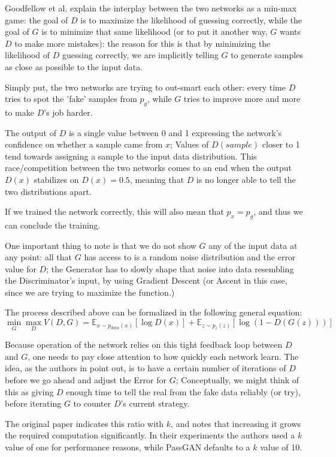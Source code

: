 Goodfellow et al.\cite{Goodfellow2014} explain the interplay between the two networks as a min-max game: the goal of $D$ is to maximize the likelihood of guessing correctly, while the goal of $G$ is to minimize that same likelihood (or to put it another way, $G$ wants $D$ to make more mistakes): the reason for this is that by minimizing the likelihood of $D$ guessing correctly, we are implicitly telling $G$ to generate samples as close as possible to the input data.

Simply put, the two networks are trying to out-smart each other: every time $D$ tries to spot the 'fake' samples from $p_g$, while $G$ tries to improve more and more to make $D$'s job harder.

The output of $D$ is a single value between 0 and 1 expressing the network's confidence on whether a sample came from $x$; Values of $D(sample)$ closer to 1 tend towards assigning a sample to the input data distribution.
This race/competition between the two networks comes to an end when the output $D(x)$ stabilizes on $D(x)=0.5$, meaning that $D$ is no longer able to tell the two distributions apart.

If we trained the network correctly, this will also mean that $p_x=p_g$, and thus we can conclude the training.

One important thing to note is that we do not show $G$ any of the input data at any point: all that $G$ has access to is a random noise distribution and the error value for $D$; the Generator has to slowly shape that noise into data resembling the Discriminator's input, by using Gradient Descent (or Ascent in this case, since we are trying to maximize the function.)

The process described above can be formalized in the following general equation:
\begin{equation}
 \min\limits_{G} \max\limits_{D} V(D,G)=\mathbb{E}_{x\sim p_{data}(x)}[\log{D(x)}]+\mathbb{E}_{z\sim p_z(z)}[\log{(1-D(G(z)))}] 
\end{equation} 

Because operation of the network relies on this tight feedback loop between $D$ and $G$, one needs to pay close attention to how quickly each network learn.
The idea, as the authors in \cite{Goodfellow2014} point out, is to have a certain number of iterations of $D$ before we go ahead and adjust the Error for $G$; Conceptually, we might think of this as giving $D$ enough time to tell the real from the fake data reliably (or try), before iterating $G$ to counter $D$'s current strategy.

The original paper indicates this ratio with $k$, and notes that increasing it grows the required computation significantly. In their experiments the authors used a $k$ value of one for performance reasons, while PassGAN defaults to a $k$ value of 10\cite{PassGAN}.
